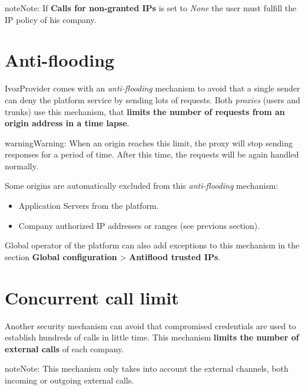 \documentclass[letterpaper,10pt,english]{sphinxmanual}
\begin{document}
\begin{notice}{note}{Note:}
If \textbf{Calls for non-granted IPs} is set to \emph{None} the user must fulfill
the IP policy of his company.
\end{notice}


\section{Anti-flooding}
\label{security/index:anti-flooding}
IvozProvider comes with an \emph{anti-flooding} mechanism to avoid that a single
sender can deny the platform service by sending lots of requests. Both \emph{proxies}
(users and trunks) use this mechanism, that \textbf{limits the number of requests
from an origin address in a time lapse}.

\begin{notice}{warning}{Warning:}
When an origin reaches this limit, the proxy will stop sending
responses for a period of time. After this time, the requests will be again
handled normally.
\end{notice}

Some origins are automatically excluded from this \emph{anti-flooding} mechanism:
\begin{itemize}
\item {} 
Application Servers from the platform.

\item {} 
Company authorized IP addresses or ranges (see previous section).

\end{itemize}

Global operator of the platform can also add exceptions to this mechanism in
the section \textbf{Global configuration} \textgreater{} \textbf{Antiflood trusted IPs}.

\noindent{}


\section{Concurrent call limit}
\label{security/index:concurrent-call-limit}
Another security mechanism can avoid that compromised credentials are used to
establish hundreds of calls in little time. This mechanism \textbf{limits the number
of external calls} of each company.

\begin{notice}{note}{Note:}
This mechanism only takes into account the external channels, both
incoming or outgoing external calls.
\end{notice}
\end{document}
